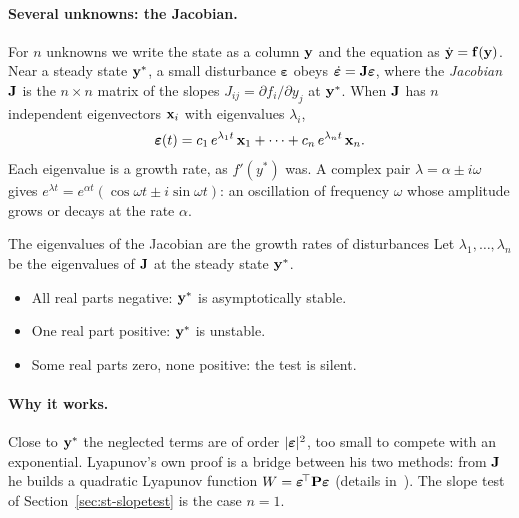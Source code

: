 \paragraph{Several unknowns: the Jacobian.}
%
For $n$ unknowns we write the state as a column $\mathbf{y}$ and the equation as
$\dot{\mathbf{y}} = \mathbf{f}(\mathbf{y})$. Near a steady state $\mathbf{y}^*$, a small
disturbance $\boldsymbol{\varepsilon}$ obeys $\dot{\boldsymbol{\varepsilon}} = \mathbf{J}\boldsymbol{\varepsilon}$,
where the \emph{Jacobian} $\mathbf{J}$ is the $n\times n$ matrix of the slopes
$J_{ij} = \partial f_i/\partial y_j$ at $\mathbf{y}^*$. When $\mathbf{J}$ has $n$
independent eigenvectors $\mathbf{x}_i$ with eigenvalues $\lambda_i$,
\begin{equation}\label{eq:st-modes}
  \boldsymbol{\varepsilon}(t) = c_1\,e^{\lambda_1 t}\,\mathbf{x}_1 + \dots
  + c_n\,e^{\lambda_n t}\,\mathbf{x}_n .
\end{equation}
Each eigenvalue is a growth rate, as $f'(y^*)$ was. A complex pair
$\lambda = \alpha \pm i\omega$ gives
$e^{\lambda t} = e^{\alpha t}(\cos\omega t \pm i\sin\omega t)$: an oscillation of
frequency $\omega$ whose amplitude grows or decays at the rate $\alpha$.

\begin{gbox}{The eigenvalues of the Jacobian are the growth rates of disturbances}\label{sec:st-eigen}
%
Let $\lambda_1,\dots,\lambda_n$ be the eigenvalues of $\mathbf{J}$ at the steady state
$\mathbf{y}^*$.
\begin{itemize}
  \item All real parts negative: $\mathbf{y}^*$ is asymptotically stable.
  \item One real part positive: $\mathbf{y}^*$ is unstable.
  \item Some real parts zero, none positive: the test is silent.
\end{itemize}
\end{gbox}

\paragraph{Why it works.}
Close to $\mathbf{y}^*$ the neglected terms are of order $\lvert \boldsymbol{\varepsilon}\rvert^2$,
too small to compete with an exponential. Lyapunov's own proof is a bridge between
his two methods: from $\mathbf{J}$ he builds a quadratic Lyapunov function
$W = \boldsymbol{\varepsilon}^{\!\top}\mathbf{P}\boldsymbol{\varepsilon}$
(details in~\cite{st-guckenheimer1983}). The slope test of
Section~\ref{sec:st-slopetest} is the case $n = 1$.

